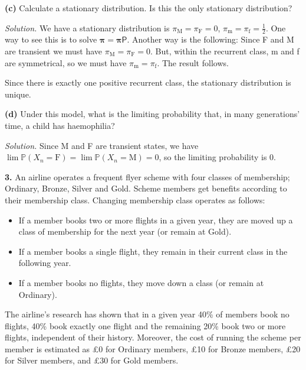 \documentclass[
  a4paper,
]{article}
\providecommand{\tightlist}{%
  \setlength{\itemsep}{0pt}\setlength{\parskip}{0pt}}
\theoremstyle{definition}
\theoremstyle{definition}
\theoremstyle{definition}
\theoremstyle{remark}
\begin{document}
\textbf{(c)} Calculate a stationary distribution. Is this the only stationary distribution?

\begin{myanswers}
\emph{Solution.}
We have a stationary distribution is \(\pi_{\mathrm M} = \pi_{\mathrm{F}} = 0\), \(\pi_{\mathrm m} = \pi_{\mathrm f} = \frac12\). One way to see this is to solve \(\boldsymbol\pi = \boldsymbol\pi\mathsf P\). Another way is the following: Since F and M are transient we must have \(\pi_{\mathrm M} = \pi_{\mathrm{F}} = 0\). But, within the recurrent class, m and f are symmetrical, so we must have \(\pi_{\mathrm m} = \pi_{\mathrm f}\). The result follows.

Since there is exactly one positive recurrent class, the stationary distribution is unique.

\end{myanswers}

\textbf{(d)} Under this model, what is the limiting probability that, in many generations' time, a child has haemophilia?

\begin{myanswers}
\emph{Solution.}
Since M and F are transient states, we have \(\lim \mathbb P(X_n = \mathrm F) = \lim \mathbb P(X_n = \mathrm M) = 0\), so the limiting probability is \(0\).

\end{myanswers}

\textbf{3.}
An airline operates a frequent flyer scheme with four classes of membership; Ordinary, Bronze, Silver and Gold. Scheme members get benefits according to their membership class.
Changing membership class operates as follows:

\begin{itemize}
\tightlist
\item
  If a member books two or more flights in a given year, they are moved up a class of membership for the next year (or remain at Gold).
\item
  If a member books a single flight, they remain in their current class in the following year.
\item
  If a member books no flights, they move down a class (or remain at Ordinary).
\end{itemize}

The airline's research has shown that in a given year 40\% of members book no flights, 40\% book exactly one flight and the remaining 20\% book two or more flights, independent of their history. Moreover, the cost of running the scheme per member is estimated as £0 for Ordinary members, £10 for Bronze members, £20 for Silver members, and £30 for Gold members.
\end{document}
